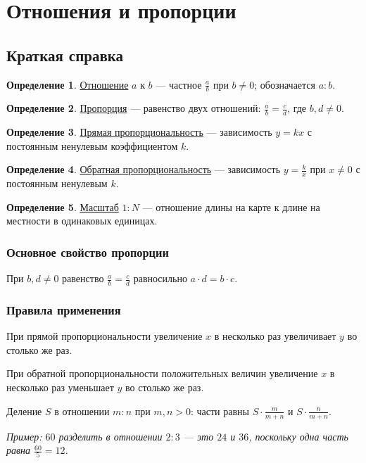 \documentclass[12pt,a4paper]{article}
\theoremstyle{definition}
\newtheorem{definition}{Определение}[section]
\theoremstyle{plain}
\theoremstyle{remark}
\newcommand{\term}[1]{\uline{#1}}
\begin{document}
\section{Отношения и пропорции}
\subsection*{Краткая справка}
\begin{definition}\term{Отношение} \(a\) к \(b\) — частное \(\frac{a}{b}\) при \(b \ne  0\); обозначается \(a : b\).\end{definition}
\begin{definition}\term{Пропорция} — равенство двух отношений: \(\frac{a}{b} = \frac{c}{d}\), где \(b,\allowbreak d \ne  0\).\end{definition}
\begin{definition}\term{Прямая пропорциональность} — зависимость \(y = kx\) с постоянным ненулевым коэффициентом \(k\).\end{definition}
\begin{definition}\term{Обратная пропорциональность} — зависимость \(y = \frac{k}{x}\) при \(x \ne  0\) с постоянным ненулевым \(k\).\end{definition}
\begin{definition}\term{Масштаб} \(1 : N\) — отношение длины на карте к длине на местности в одинаковых единицах.\end{definition}
\subsubsection*{Основное свойство пропорции}
При \(b,\allowbreak d \ne  0\) равенство \(\frac{a}{b} = \frac{c}{d}\) равносильно \(a \cdot  d = b \cdot  c\).\par
\subsubsection*{Правила применения}
При прямой пропорциональности увеличение \(x\) в несколько раз увеличивает \(y\) во столько же раз.\par
При обратной пропорциональности положительных величин увеличение \(x\) в несколько раз уменьшает \(y\) во столько же раз.\par
Деление \(S\) в отношении \(m : n\) при \(m,\allowbreak n > 0\): части равны \(S \cdot  \frac{m}{m + n}\) и \(S \cdot  \frac{n}{m + n}\).\par
{\small\textit{Пример: \(60\) разделить в отношении \(2 : 3\) — это \(24\) и \(36\), поскольку одна часть равна \(\frac{60}{5} = 12\).}}\par
\end{document}
